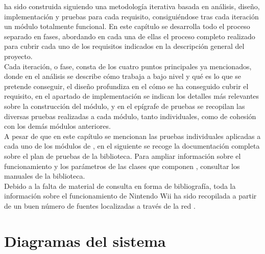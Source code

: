 



 ha sido construida siguiendo una metodología iterativa basada en análisis, diseño, implementación y pruebas para cada requisito, consiguiéndose tras cada iteración un módulo totalmente funcional. En este capítulo se desarrolla todo el proceso separado en fases, abordando en cada una de ellas el proceso completo realizado para cubrir cada uno de los requisitos indicados en la descripción general del proyecto.\\

Cada iteración, o fase, consta de los cuatro puntos principales ya mencionados, donde en el análisis se describe cómo trabaja  a bajo nivel y qué es lo que se pretende conseguir, el diseño profundiza en el cómo se ha conseguido cubrir el requisito, en el apartado de implementación se indican los detalles más relevantes sobre la construcción del módulo, y en el epígrafe de pruebas se recopilan las diversas pruebas realizadas a cada módulo, tanto individuales, como de cohesión con los demás módulos anteriores.\\

A pesar de que en este capítulo se mencionan las pruebas individuales aplicadas a cada uno de los módulos de , en el siguiente se recoge la documentación completa sobre el plan de pruebas de la biblioteca. Para ampliar información sobre el funcionamiento y los parámetros de las clases que componen , consultar los manuales de la biblioteca.\\

Debido a la falta de material de consulta en forma de bibliografía, toda la información sobre el funcionamiento de Nintendo Wii ha sido recopilada a partir de un buen número de fuentes localizadas a través de la red \cite{website:tutorialhermes} \cite{website:wiibrew} \cite{website:scenebeta} \cite{website:gamedev}.

\section{Diagramas del sistema}

